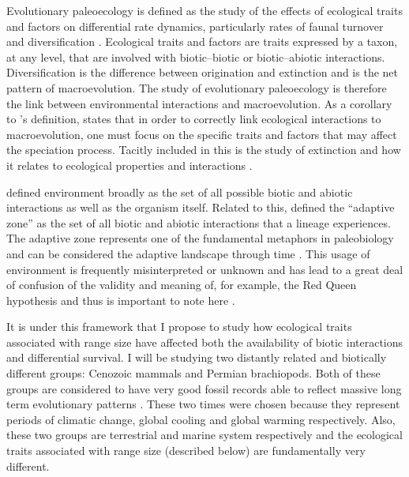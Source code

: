 \documentclass[12pt,letterpaper]{article}
\begin{document}
Evolutionary paleoecology is defined as the study of the effects of ecological traits and factors on differential rate dynamics, particularly rates of faunal turnover and diversification \citep{Kitchell1985a}. Ecological traits and factors are traits expressed by a taxon, at any level, that are involved with biotic--biotic or biotic--abiotic interactions. Diversification is the difference between origination and extinction and is the net pattern of macroevolution. The study of evolutionary paleoecology is therefore the link between environmental interactions and macroevolution. As a corollary to \citet{Kitchell1985a}'s definition, \citet{Allmon1994} states that in order to correctly link ecological interactions to macroevolution, one must focus on the specific traits and factors that may affect the speciation process. Tacitly included in this is the study of extinction and how it relates to ecological properties and interactions \citep{Kitchell1990}.

\citet{Simpson1944} defined environment broadly as the set of all possible biotic and abiotic interactions as well as the organism itself. Related to this, \citet{Simpson1944} defined the ``adaptive zone'' as the set of all biotic and abiotic interactions that a lineage experiences. The adaptive zone represents one of the fundamental metaphors in paleobiology and can be considered the adaptive landscape through time \citep{Simpson1944,Simpson1953}. This usage of environment is frequently misinterpreted or unknown and has lead to a great deal of confusion of the validity and meaning of, for example, the Red Queen hypothesis and thus is important to note here \citep{VanValen1973,Barnosky2001a,Liow2011a}. 

It is under this framework that I propose to study how ecological traits associated with range size have affected both the availability of biotic interactions and differential survival. I will be studying two distantly related and biotically different groups: Cenozoic mammals and Permian brachiopods. Both of these groups are considered to have very good fossil records able to reflect massive long term evolutionary patterns \citep{Mark1977}. These two times were chosen because they represent periods of climatic change, global cooling and global warming respectively. Also, these two groups are terrestrial and marine system respectively and the ecological traits associated with range size (described below) are fundamentally very different. 

\end{document}
